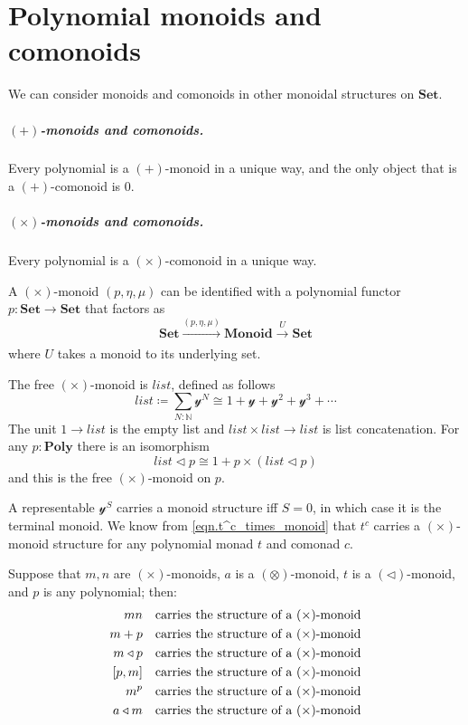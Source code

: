 \documentclass[11pt, one side, article]{memoir}
\theoremstyle{definition}
\theoremstyle{plain}
\newcommand{\Cat}[1]{\mathbf{#1}}%
\newcommand{\Fun}[1]{\mathit{#1}}%
\newcommand{\To}[2][]{\xrightarrow[#1]{#2}}
\newcommand{\tn}[1]{\textnormal{#1}}
\newcommand{\nn}{\mathbb{N}}
\newcommand{\smset}{\Cat{Set}}
\newcommand{\List}{\Fun{list}}
\newcommand{\yon}{\mathcal{y}}
\newcommand{\poly}{\Cat{Poly}}
\newcommand{\0}{\textsf{0}}
\newcommand{\1}{\tn{\textsf{1}}}
\newcommand{\tri}{\mathbin{\triangleleft}}
\newcommand{\uu}{\List}
\begin{document}
\chapter{Polynomial monoids and comonoids}\label{chap.monoids.comonoids}

We can consider monoids and comonoids in other monoidal structures on $\smset$. 

\paragraph{$(+)$-monoids and comonoids.}
Every polynomial is a $(+)$-monoid in a unique way, and the only object that is a $(+)$-comonoid is $0$.

\paragraph{$(\times)$-monoids and comonoids.}
Every polynomial is a $(\times)$-comonoid in a unique way.

A $(\times)$-monoid $(p,\eta,\mu)$ can be identified with a polynomial functor $p\colon\smset\to\smset$ that factors as
\begin{equation}
	\smset\To{(p,\eta,\mu)}\Cat{Monoid}\To{U}\smset
\end{equation}
where $U$ takes a monoid to its underlying set.

The free $(\times)$-monoid is $\uu$, defined as follows
\begin{equation}\label{eqn.list}
\uu\coloneqq\sum_{N:\nn}\yon^N\cong 1+\yon+\yon^2+\yon^3+\cdots
\end{equation}
The unit $1\to\uu$ is the empty list and $\uu\times\uu\to\uu$ is list concatenation. For any $p:\poly$ there is an isomorphism
\begin{equation}\label{eqn.unfolding_list}
\uu\tri p\cong 1+p\times(\uu\tri p)
\end{equation}
and this is the free $(\times)$-monoid on $p$.

A representable $\yon^S$ carries a monoid structure iff $S=0$, in which case it is the terminal monoid. We know from \eqref{eqn.t^c_times_monoid} that $t^c$ carries a $(\times)$-monoid structure for any polynomial monad $t$ and comonad $c$.

Suppose that $m,n$ are $(\times)$-monoids, $a$ is a $(\otimes)$-monoid, $t$ is a $(\tri)$-monoid, and $p$ is any polynomial; then:
\begin{align}
	mn&\quad\tn{carries the structure of a $(\times)$-monoid}\\
	m+p&\quad\tn{carries the structure of a $(\times)$-monoid}\\
	m\tri p&\quad\tn{carries the structure of a $(\times)$-monoid}\\
	[p,m]&\quad\tn{carries the structure of a $(\times)$-monoid}\\
	m^p&\quad\tn{carries the structure of a $(\times)$-monoid}\\
	a\tri m&\quad\tn{carries the structure of a $(\times)$-monoid}\\
\end{align}
\end{document}
